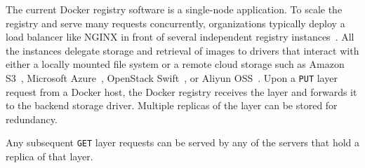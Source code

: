 The current Docker registry software is a single-node application.
%
To scale the registry and serve many requests concurrently, organizations typically deploy a load
balancer like NGINX in front of several independent registry
instances~\cite{dockerworkload, anwar-cloud19}.
%
All the instances delegate storage and retrieval of images to drivers that interact with
either a locally mounted file system or a remote cloud storage such as Amazon
S3~\cite{s3}, Microsoft Azure~\cite{azure}, OpenStack Swift~\cite{swift}, or
Aliyun OSS~\cite{aliyun}.
%
%
Upon a \texttt{PUT} layer request from a Docker host, the Docker registry receives the layer and forwards it to the
backend storage driver. Multiple replicas of the layer can be stored for redundancy.
%

Any subsequent \texttt{GET} layer requests can be served by any of the servers that hold a replica of that layer. 

%


%
%
%
%
%
%
%

